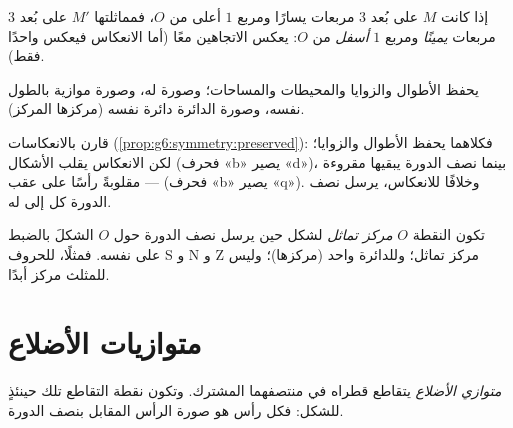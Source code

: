 \begin{example}\label{ex:g7:central:grid}
إذا كانت $M$ على بُعد $3$ مربعات يسارًا ومربع $1$ أعلى من $O$، فمماثلتها
$M'$ على بُعد $3$ مربعات \emph{يمينًا} ومربع $1$ \emph{أسفل} من $O$:
 يعكس الاتجاهين معًا (أما الانعكاس
فيعكس واحدًا فقط).
\end{example}

\begin{proposition}\label{prop:g7:central:preserved}
 يحفظ الأطوال والزوايا والمحيطات والمساحات؛
وصورة   \emph{} له، وصورة  
موازية بالطول نفسه، وصورة الدائرة دائرة
 نفسه (مركزها  المركز).
\end{proposition}
\admitted

\begin{remark}
قارن بالانعكاسات (\cref{prop:g6:symmetry:preserved}): فكلاهما
يحفظ الأطوال والزوايا؛ لكن الانعكاس يقلب الأشكال
(فحرف «b» يصير «d»)، بينما نصف الدورة يبقيها مقروءة ---
مقلوبةً رأسًا على عقب (فحرف «b» يصير «q»). وخلافًا للانعكاس، يرسل
نصف الدورة كل  إلى   له.
\end{remark}

\begin{definition}\label{def:g7:central:center}
تكون النقطة $O$ \emph{مركز تماثل}
لشكل حين يرسل نصف الدورة حول $O$ الشكلَ بالضبط
على نفسه. فمثلًا، للحروف S و N و Z مركز
تماثل؛ وللدائرة واحد (مركزها)؛ وليس للمثلث مركز أبدًا.
\end{definition}

\section{متوازيات الأضلاع}

\begin{definition}\label{def:g7:central:parallelogram}
\emph{متوازي الأضلاع} 
يتقاطع قطراه في منتصفهما المشترك. وتكون نقطة التقاطع تلك حينئذٍ
 للشكل: فكل رأس هو صورة الرأس
المقابل بنصف الدورة.
\end{definition}

